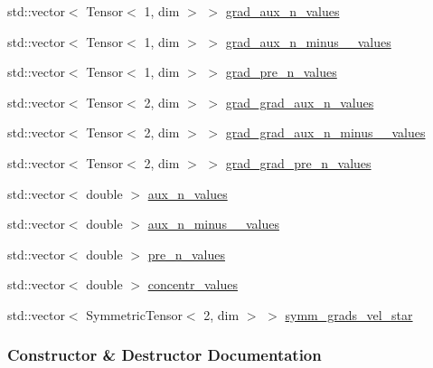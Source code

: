 \begin{DoxyCompactItemize}
\item 
std\+::vector$<$ Tensor$<$ 1, dim $>$ $>$ \hyperlink{struct_assembly_1_1_scratch_1_1diffusion__step_ab292f23db9b98fbccc85767584d1af32}{grad\+\_\+aux\+\_\+n\+\_\+values}
\item 
std\+::vector$<$ Tensor$<$ 1, dim $>$ $>$ \hyperlink{struct_assembly_1_1_scratch_1_1diffusion__step_aa1bdc6944aab9389b86a40688274fdee}{grad\+\_\+aux\+\_\+n\+\_\+minus\+\_\+\_\+values}
\item 
std\+::vector$<$ Tensor$<$ 1, dim $>$ $>$ \hyperlink{struct_assembly_1_1_scratch_1_1diffusion__step_aa11a441604ebd698e5294c6ab3a1ffaf}{grad\+\_\+pre\+\_\+n\+\_\+values}
\item 
std\+::vector$<$ Tensor$<$ 2, dim $>$ $>$ \hyperlink{struct_assembly_1_1_scratch_1_1diffusion__step_a8bc0709a8e9e4ba5e0f663e134444978}{grad\+\_\+grad\+\_\+aux\+\_\+n\+\_\+values}
\item 
std\+::vector$<$ Tensor$<$ 2, dim $>$ $>$ \hyperlink{struct_assembly_1_1_scratch_1_1diffusion__step_a0bbde8769e9f2cc428d9bf0f810c7227}{grad\+\_\+grad\+\_\+aux\+\_\+n\+\_\+minus\+\_\+\_\+values}
\item 
std\+::vector$<$ Tensor$<$ 2, dim $>$ $>$ \hyperlink{struct_assembly_1_1_scratch_1_1diffusion__step_a64c3cf16bc7cf4fa8972153f93014cb9}{grad\+\_\+grad\+\_\+pre\+\_\+n\+\_\+values}
\item 
std\+::vector$<$ double $>$ \hyperlink{struct_assembly_1_1_scratch_1_1diffusion__step_a3790368f163ebc0f1671baa5b535b018}{aux\+\_\+n\+\_\+values}
\item 
std\+::vector$<$ double $>$ \hyperlink{struct_assembly_1_1_scratch_1_1diffusion__step_a29786a1632b7b97b41219b6e6804924e}{aux\+\_\+n\+\_\+minus\+\_\+\_\+values}
\item 
std\+::vector$<$ double $>$ \hyperlink{struct_assembly_1_1_scratch_1_1diffusion__step_ae1586636fe3416c069fe1efaa51c80f2}{pre\+\_\+n\+\_\+values}
\item 
std\+::vector$<$ double $>$ \hyperlink{struct_assembly_1_1_scratch_1_1diffusion__step_a2ee9059b21d32ee414bdf8eb96d3c451}{concentr\+\_\+values}
\item 
std\+::vector$<$ Symmetric\+Tensor$<$ 2, dim $>$ $>$ \hyperlink{struct_assembly_1_1_scratch_1_1diffusion__step_a368904230be585863ee201beabbc8fb6}{symm\+\_\+grads\+\_\+vel\+\_\+star}
\end{DoxyCompactItemize}


\subsubsection{Constructor \& Destructor Documentation}
\hypertarget{struct_assembly_1_1_scratch_1_1diffusion__step_a5769d06dbf6b99961da088f11f24cce3}{}
